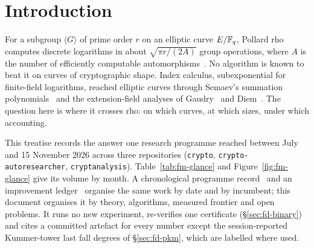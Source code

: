 \chapter*{Introduction}\label{ch:intro}

For a subgroup $\langle G\rangle$ of prime order $r$ on an elliptic curve
$E/\mathbb{F}_q$, Pollard rho~\cite{pollard1978,vanoorschot1999} computes discrete
logarithms in about $\sqrt{\pi r/(2A)}$ group operations, where $A$ is the
number of efficiently computable automorphisms~\cite{wiener1998,gallant2000}.
No algorithm is known to beat it on curves of cryptographic shape. Index
calculus, subexponential for finite-field logarithms, reached elliptic
curves through Semaev's summation polynomials~\cite{semaev2004} and the
extension-field analyses of Gaudry~\cite{gaudry2009} and
Diem~\cite{diem2011}. The question here is where it crosses rho: on which
curves, at which sizes, under which accounting.

This treatise records the answer one research programme reached between
July and 15 November 2026 across three repositories (\texttt{crypto},
\texttt{crypto-autoresearcher}, \texttt{cryptanalysis}).
Table~\ref{tab:fm-glance} and Figure~\ref{fig:fm-glance} give its volume
by month. A chronological programme record~\cite{icprogram2026} and an
improvement ledger~\cite{icledger2026} organise the same work by date and
by incumbent; this document organises it by theory, algorithms, measured
frontier and open problems. It runs no new experiment, re-verifies one
certificate (\S\ref{sec:fd-binary}) and cites a committed artefact for
every number except the session-reported Kummer-tower last fall degrees of
\S\ref{sec:fd-pkm}, which are labelled where used.

\begin{table}[t]
\centering\scriptsize\setlength{\tabcolsep}{3pt}

\caption[]{The programme by month. Ledger columns: decisions, distinct
experiments and run directories of the \texttt{crypto-autoresearcher}
ledger, 19 July--30 September, copied from
 (its seven
October-dated rows are late-September files and are left out). Other
columns are counted at \texttt{origin/main} \texttt{05f73826}: top-level
 directories by the date in their name ($^a$25 undated);
ecbench session capsules by start time, with their sealed records;
admitted rows of , with the number whose
directory holds a \texttt{VALIDATION.json}; rows removed to
; \texttt{validation-gate/v1} files
($^b$4 undated; benchmark copies counted separately); \texttt{pcc} claim
records. Counting rules and blob hashes:
; table built by
. Totals are sums of the rows.}
\label{tab:fm-glance}
\end{table}

